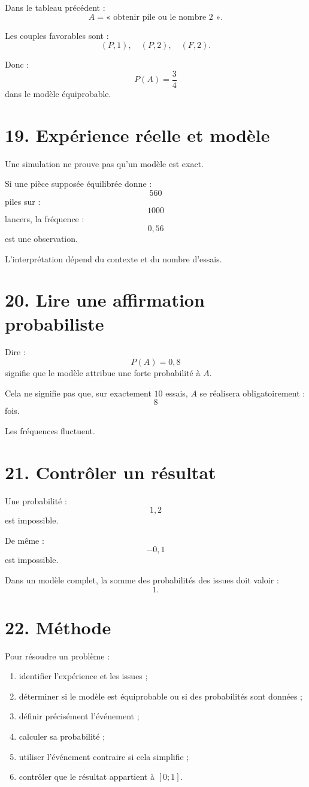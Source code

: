 Dans le tableau précédent :
\[
A=\text{« obtenir pile ou le nombre }2\text{ »}.
\]

Les couples favorables sont :
\[
(P,1),\quad(P,2),\quad(F,2).
\]

Donc :
\[
P(A)=\dfrac34
\]
dans le modèle équiprobable.

\section{19. Expérience réelle et modèle}

Une simulation ne prouve pas qu'un modèle est exact.

Si une pièce supposée équilibrée donne :
\[
560
\]
piles sur :
\[
1000
\]
lancers, la fréquence :
\[
0{,}56
\]
est une observation.

L'interprétation dépend du contexte et du nombre d'essais.

\section{20. Lire une affirmation probabiliste}

Dire :
\[
P(A)=0{,}8
\]
signifie que le modèle attribue une forte probabilité à $A$.

Cela ne signifie pas que, sur exactement $10$ essais, $A$ se réalisera obligatoirement :
\[
8
\]
fois.

Les fréquences fluctuent.

\section{21. Contrôler un résultat}

Une probabilité :
\[
1{,}2
\]
est impossible.

De même :
\[
-0{,}1
\]
est impossible.

Dans un modèle complet, la somme des probabilités des issues doit valoir :
\[
1.
\]

\section{22. Méthode}

\begin{methode}
Pour résoudre un problème :
\begin{enumerate}
\item identifier l'expérience et les issues ;
\item déterminer si le modèle est équiprobable ou si des probabilités sont données ;
\item définir précisément l'événement ;
\item calculer sa probabilité ;
\item utiliser l'événement contraire si cela simplifie ;
\item contrôler que le résultat appartient à $[0;1]$.
\end{enumerate}
\end{methode}

